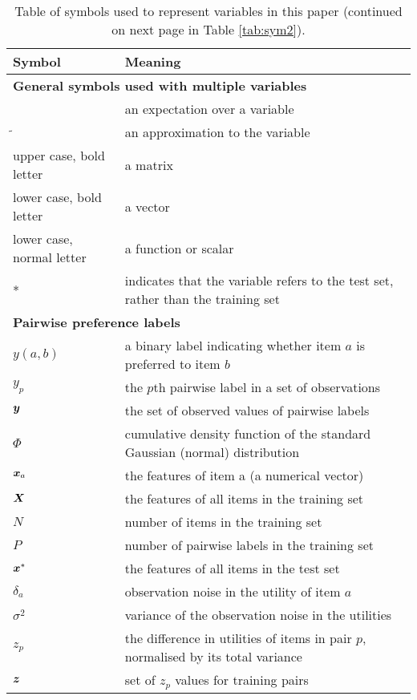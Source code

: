 \begin{table}[h!]
 \begin{tabularx}{\columnwidth}{p{1.7cm} X }
 \toprule 
 Symbol & Meaning \\
 \midrule 
 \multicolumn{2}{l}{\textbf{General symbols used with multiple variables}} \\
 $\hat{}$ & an expectation over a variable \\
 $\tilde{}$ & an approximation to the variable \\
 upper case, bold letter & a matrix \\
 lower case, bold letter & a vector \\
 lower case, normal letter & a function or scalar \\
 * & indicates that the variable refers to the test set, rather than the training set \\
  \multicolumn{2}{l}{\textbf{Pairwise preference labels}} \\
 $y(a,b)$ & a binary label indicating whether item $a$ is preferred to item $b$ \\
 $y_p$ & the $p$th pairwise label in a set of observations \\
 $\boldsymbol y$ & the set of observed values of pairwise labels \\
 $\Phi$ & cumulative density function of the standard Gaussian (normal) distribution \\
 $\boldsymbol x_a$ & the features of item a (a numerical vector) \\
 $\boldsymbol X$ & the features of all items in the training set \\
 $N$ & number of items in the training set \\
 $P$ & number of pairwise labels in the training set \\
 $\boldsymbol x^*$ & the features of all items in the test set \\
 $\delta_a$ & observation noise in the utility of item $a$ \\
 $\sigma^2$ & variance of the observation noise in the utilities \\
 $z_p$ & the difference in utilities of items in pair $p$, normalised by its total variance \\
 $\boldsymbol z$ & set of $z_p$ values for training pairs \\ 
  \bottomrule
 \end{tabularx}
 \caption{Table of symbols used to represent variables in this paper (continued on next page
 in Table \ref{tab:sym2}).}
 \label{tab:sym1}
\end{table}

